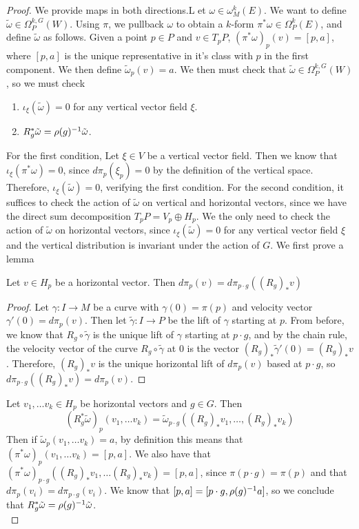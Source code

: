 \begin{proof}
We provide maps in both directions.L et $\omega \in \omega_M^k(E)$. We want to define
$\widetilde{\omega} \in \Omega_P^{k,G}(W)$. Using $\pi$, we pullback
$\omega$ to obtain a $k$-form $\pi^*\omega \in \Omega_P^k(E)$, and define
$\tilde{\omega}$ as follows. Given a point $p \in P$ and $v \in T_pP$,
$(\pi^*\omega)_p(v) = [p, a]$, where $[p,a]$ is the unique representative in
it's class with $p$ in the first component. We then define
$\tilde{\omega}_p(v) = a$. We then must check that
$\tilde{\omega} \in \Omega^{k,G}_P(W)$, so we must check
\begin{enumerate}
  \item $\iota_{\xi}(\tilde{\omega}) = 0$ for any vertical vector field $\xi$.
  \item $R_g^*\tilde{\omega} = \rho(g)^{-1}\tilde{\omega}$.
\end{enumerate}
For the first condition, Let $\xi \in V$ be a vertical vector field. Then we know that
$\iota_{\xi}(\pi^*\omega)= 0$, since $d\pi_p(\xi_p) = 0$ by the definition of the
vertical space. Therefore, $\iota_{\xi}(\tilde{\omega}) = 0$, verifying the
first condition. For the second condition, it suffices to check the action of
$\tilde{\omega}$ on vertical and horizontal vectors, since we have the direct
sum decomposition $T_pP = V_p \oplus H_p$. We the only need to check the action
of $\tilde{\omega}$ on horizontal vectors, since $\iota_\xi({\tilde{\omega}}) = 0$
for any vertical vector field $\xi$ and the vertical distribution is invariant
under the action of $G$. We first prove a lemma
%
\begin{lem*}
Let $v \in H_p$ be a horizontal vector. Then
$d\pi_p(v) = d\pi_{p \cdot g}((R_g)_*v)$
\end{lem*}
%
\begin{proof}
Let $\gamma : I \to M$ be a curve with $\gamma(0) = \pi(p)$ and velocity vector
$\gamma'(0) = d\pi_p(v)$. Then let $\tilde{\gamma} : I \to P$ be the lift of
$\gamma$ starting at $p$. From before, we know that $R_g \circ \tilde{\gamma}$
is the unique lift of $\gamma$ starting at $p \cdot g$, and by the chain rule,
the velocity vector of the curve $R_g \circ \tilde{\gamma}$ at $0$ is the vector
$(R_g)_*\tilde{\gamma}'(0) = (R_g)_*v$. Therefore, $(R_g)_*v$ is the unique
horizontal lift of $d\pi_p(v)$ based at $p \cdot g$, so
$d\pi_{p \cdot g}((R_g)_*v) = d\pi_p(v)$.
\end{proof}
%
Let $v_1, \ldots v_k \in H_p$ be horizontal vectors and $g \in G$. Then
\[
(R_g^*\tilde{\omega})_p(v_1,\ldots v_k) =
\tilde{\omega}_{p \cdot g}((R_g)_*v_1, \ldots , (R_g)_* v_k)
\]
Then if $\tilde{\omega}_p(v_1, \ldots v_k) = a$, by definition this means that
$(\pi^*\omega)_p(v_1, \ldots v_k) = [p,a]$. We also have that
$(\pi^*\omega)_{p\cdot g}((R_g)_*v_1,\ldots (R_g)_*v_k) = [p,a]$, since
$\pi(p \cdot g) = \pi(p)$ and that $d\pi_p(v_i) = d\pi_{p \cdot g}(v_i)$.
We know that $[p,a] = [p \cdot g, \rho(g)^{-1} a]$, so we conclude that
$R_g^*\tilde{\omega} = \rho(g)^{-1}\tilde{\omega}$.\\


\end{proof}
